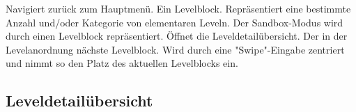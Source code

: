 \begin{center}
\setlength\fboxsep{20pt}
\setlength\fboxrule{1pt}
\end{center}

\begin{requirements}
 Navigiert zurück zum Hauptmenü.
 Ein Levelblock. Repräsentiert eine bestimmte Anzahl und/oder Kategorie von elementaren Leveln. Der Sandbox-Modus wird durch einen Levelblock repräsentiert. Öffnet die Leveldetailübersicht.
 Der in der Levelanordnung nächste Levelblock. Wird durch eine "Swipe"-Eingabe zentriert und nimmt so den Platz des aktuellen Levelblocks ein.
\end{requirements}

\subsection{Leveldetailübersicht}

\begin{center}
\setlength\fboxsep{20pt}
\setlength\fboxrule{1pt}
\end{center}

